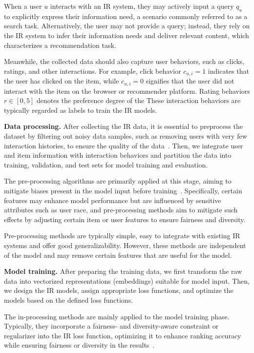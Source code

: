 When a user $u$ interacts with an IR system, they may actively input a query $q_u$ to explicitly express their information need, a scenario commonly referred to as a search task. Alternatively, the user may not provide a query; instead, they rely on the IR system to infer their information needs and deliver relevant content, which characterizes a recommendation task.

Meanwhile, the collected data should also capture user behaviors, such as clicks, ratings, and other interactions.
For example, click behavior $c_{u,i}=1$ indicates that the user has clicked on the item, while $c_{u,i}=0$ signifies that the user did not interact with the item on the browser or recommender platform. Rating behaviors $r\in [0,5]$ denotes the preference degree of the 
These interaction behaviors are typically regarded as labels to train the IR models.

\noindent\textbf{Data processing.}
After collecting the IR data, it is essential to preprocess the dataset by filtering out noisy data samples, such as removing users with very few interaction histories, to ensure the quality of the data~\cite{recbole}. Then, we integrate user and item information with interaction behaviors and partition the data into training, validation, and test sets for model training and evaluation.

The pre-processing algorithms are primarily applied at this stage, aiming to mitigate biases present in the model input before training~\cite{rus2024study}. Specifically, certain features may enhance model performance but are influenced by sensitive attributes such as user race, and pre-processing methods aim to mitigate such effects by adjusting certain item or user features to ensure fairness and diversity.

Pre-processing methods are typically simple, easy to integrate with existing IR systems and offer good generalizability. However, these methods are independent of the model and may remove certain features that are useful for the model.

\noindent\textbf{Model training.}
After preparing the training data, we first transform the raw data into vectorized representations (\ie embeddings) suitable for model input. Then, we design the IR models, assign appropriate loss functions, and optimize the models based on the defined loss functions.

The in-processing methods are mainly applied to the model training phase. Typically, they incorporate a fairness- and diversity-aware constraint or regularizer into the IR loss function, optimizing it to enhance ranking accuracy while ensuring fairness or diversity in the results~\cite{APR, FairNeg}. 

